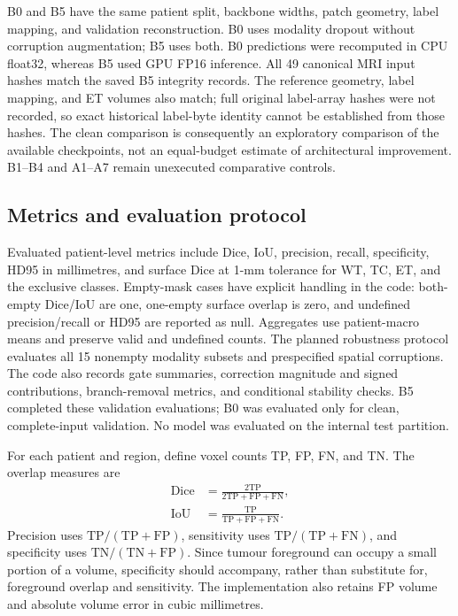 \documentclass[conference]{IEEEtran}
\begin{document}
B0 and B5 have the same patient split, backbone widths, patch geometry, label mapping, and validation reconstruction. B0 uses modality dropout without corruption augmentation; B5 uses both. B0 predictions were recomputed in CPU float32, whereas B5 used GPU FP16 inference. All 49 canonical MRI input hashes match the saved B5 integrity records. The reference geometry, label mapping, and ET volumes also match; full original label-array hashes were not recorded, so exact historical label-byte identity cannot be established from those hashes. The clean comparison is consequently an exploratory comparison of the available checkpoints, not an equal-budget estimate of architectural improvement. B1--B4 and A1--A7 remain unexecuted comparative controls.

\subsection{Metrics and evaluation protocol}
Evaluated patient-level metrics include Dice, IoU, precision, recall, specificity, HD95 in millimetres, and surface Dice at 1-mm tolerance for WT, TC, ET, and the exclusive classes. Empty-mask cases have explicit handling in the code: both-empty Dice/IoU are one, one-empty surface overlap is zero, and undefined precision/recall or HD95 are reported as null. Aggregates use patient-macro means and preserve valid and undefined counts. The planned robustness protocol evaluates all 15 nonempty modality subsets and prespecified spatial corruptions. The code also records gate summaries, correction magnitude and signed contributions, branch-removal metrics, and conditional stability checks. B5 completed these validation evaluations; B0 was evaluated only for clean, complete-input validation. No model was evaluated on the internal test partition.

For each patient and region, define voxel counts TP, FP, FN, and TN. The overlap measures are
\begin{align}
\operatorname{Dice}&=\frac{2\mathrm{TP}}{2\mathrm{TP}+\mathrm{FP}+\mathrm{FN}},\\
\operatorname{IoU}&=\frac{\mathrm{TP}}{\mathrm{TP}+\mathrm{FP}+\mathrm{FN}}.
\end{align}
Precision uses $\mathrm{TP}/(\mathrm{TP}+\mathrm{FP})$, sensitivity uses $\mathrm{TP}/(\mathrm{TP}+\mathrm{FN})$, and specificity uses $\mathrm{TN}/(\mathrm{TN}+\mathrm{FP})$. Since tumour foreground can occupy a small portion of a volume, specificity should accompany, rather than substitute for, foreground overlap and sensitivity. The implementation also retains FP volume and absolute volume error in cubic millimetres.
\end{document}
